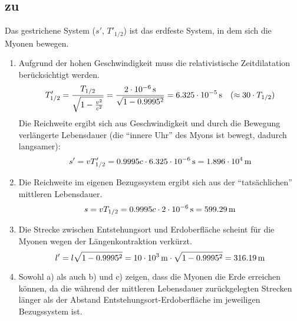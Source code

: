 \documentclass[a4paper]{scrartcl}
\begin{document}
\subsection{zu }
\label{lsg:Myonen} Das gestrichene System ($s'$, $T'_{1/2}$) ist das erdfeste System, in dem sich die Myonen bewegen.
\begin{enumerate}
  \item Aufgrund der hohen Geschwindigkeit muss die relativistische Zeitdilatation berücksichtigt werden.
  \begin{equation*}
    T'_{1/2} = \frac{T_{1/2}}{\sqrt{1-\frac{v^2}{c^2}}} = \frac{\unit[2\cdot 10^{-6}]{s}}{\sqrt{1-0.9995^2}} = \unit[6.325\cdot 10^{-5}]{s} \quad ( \approx 30 \cdot T_{1/2})
  \end{equation*}
  Die Reichweite ergibt sich aus Geschwindigkeit und durch die Bewegung verlängerte Lebensdauer (die "`innere Uhr"' des Myons ist bewegt, dadurch langsamer):
  \begin{equation*}
    s' = vT'_{1/2} = 0.9995c \cdot \unit[6.325\cdot 10^{-6}]{s} = \unit[1.896 \cdot 10^{4}]{m}
  \end{equation*}

\item Die Reichweite im eigenen Bezugssystem ergibt sich aus der "`tatsächlichen"' mittleren Lebensdauer.
  \begin{equation*}
    s = vT_{1/2} = 0.9995c \cdot \unit[2\cdot 10^{-6}]{s} = \unit[599.29]{m}
  \end{equation*}

\item Die Strecke zwischen Entstehungsort und Erdoberfläche scheint für die Myonen wegen der Längenkontraktion verkürzt.
  \begin{equation*}
    l' = l\sqrt{1-0.9995^2} = \unit[10 \cdot 10^3]{m} \cdot \sqrt{1-0.9995^2} = \unit[316.19]{m}
  \end{equation*}
\item Sowohl a) als auch b) und c) zeigen, dass die Myonen die Erde erreichen können, da die während der mittleren Lebensdauer zurückgelegten Strecken länger als der Abstand Entstehungsort-Erdoberfläche im jeweiligen Bezugssystem ist.
\end{enumerate}
\end{document}
